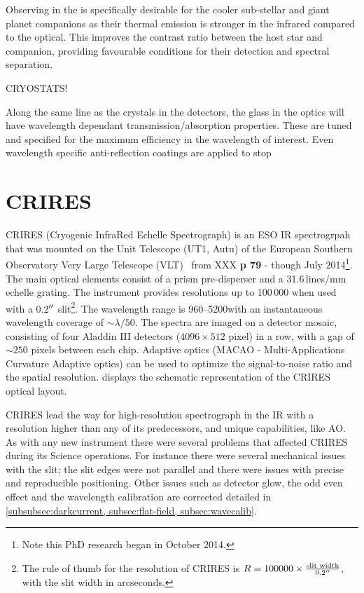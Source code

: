 



Observing in the \nir{} is specifically desirable for the cooler sub-stellar and giant planet companions as their thermal emission is stronger in the infrared compared to the optical.
This improves the contrast ratio between the host star and companion, providing favourable conditions for their detection and spectral separation.


CRYOSTATS!

Along the same line as the crystals in the detectors, the glass in the optics will have wavelength dependant transmission/absorption properties. These are tuned and specified for the maximum efficiency in the wavelength of interest. Even wavelength specific anti-reflection coatings are applied to stop


\section{CRIRES}
CRIRES (Cryogenic InfraRed Echelle Spectrograph) is an ESO IR spectrogrpah that was mounted on the Unit Telescope (UT1, Autu) of the European Southern Observatory Very Large Telescope (VLT)~\citep{kaeufl 2004 } from XXX \textbf{p 79} - though July 2014\footnote{Note this PhD research began in October 2014.}.
The main optical elements consist of a prism pre-disperser and a 31.6\,lines/mm echelle grating.
The instrument provides resolutions up to 100\,000 when used with a 0.2$^{\prime\prime}$ slit\footnote{The rule of thumb for the resolution of CRIRES is \(R = 100000 \times \frac{\textrm{slit width}}{0.2^{\prime\prime}}\), with the slit width in arcseconds.}.
The wavelength range is 960--5200\nm with an instantaneous wavelength coverage of \(\sim \lambda/50\).
The spectra are imaged on a detector mosaic, consisting of four Aladdin III detectors (\(4096 \times 512\) pixel) in a row, with a gap of \(\sim 250\) pixels between each chip.
Adaptive optics (MACAO - Multi-Applications Curvature Adaptive optics) can be used to optimize the signal-to-noise ratio and the spatial resolution.
 displays the schematic representation of the CRIRES optical layout.

CRIRES lead the way for high-resolution spectrograph in the IR with a resolution higher than any of its predecessors, and unique capabilities, like AO.
As with any new instrument there were several problems that affected CRIRES during its Science operations.
For instance there were several mechanical issues with the slit; the slit edges were not parallel and there were issues with precise and reproducible positioning.
Other issues such as detector glow, the odd even effect and the wavelength calibration are corrected detailed in \cref{subsubsec:darkcurrent, subsec:flat-field, subsec:wavecalib}.



